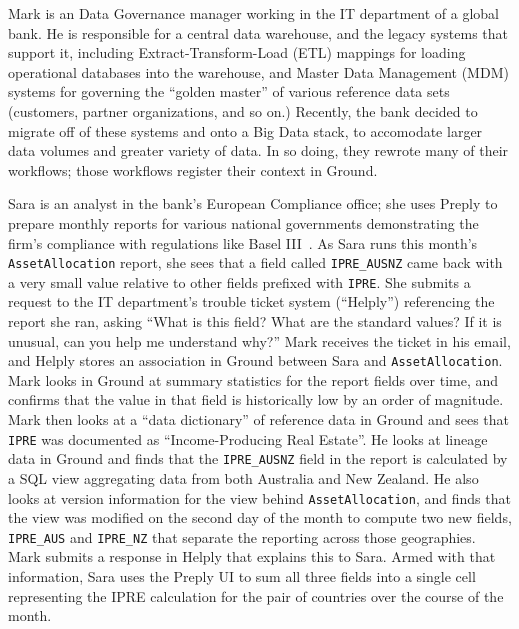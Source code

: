 \documentclass{sig-alternate}
\begin{document}
Mark is an Data Governance manager working in the IT department of a global bank. He is responsible for a central data warehouse, and the legacy systems that support it, including Extract-Transform-Load (ETL) mappings for loading operational databases into the warehouse, and Master Data Management (MDM) systems for governing the ``golden master'' of various reference data sets (customers, partner organizations, and so on.) Recently, the bank decided to migrate off of these systems and onto a Big Data stack, to accomodate larger data volumes and greater variety of data. In so doing, they rewrote many of their workflows; those workflows register their context in Ground.

Sara is an analyst in the bank's European Compliance office; she uses Preply to prepare monthly reports for various national governments demonstrating the firm's compliance with regulations like Basel III~\cite{basel3}. As Sara runs this month's \texttt{AssetAllocation} report, she sees that a field called \texttt{IPRE\_AUSNZ} came back with a very small value relative to other fields prefixed with \texttt{IPRE}. She submits a request to the IT department's trouble ticket system (``Helply'') referencing the report she ran, asking ``What is this field? What are the standard values? If it is unusual, can you help me understand why?'' Mark receives the ticket in his email, and Helply stores an association in Ground between Sara and \texttt{AssetAllocation}. Mark looks in Ground at summary statistics for the report fields over time, and confirms that the value in that field is historically low by an order of magnitude. Mark then looks at a ``data dictionary'' of reference data in Ground and sees that \texttt{IPRE} was documented as ``Income-Producing Real Estate''. He looks at lineage data in Ground and finds that the \texttt{IPRE\_AUSNZ} field in the report is calculated by a SQL view aggregating data from both Australia and New Zealand. He also looks at version information for the view behind \texttt{AssetAllocation}, and finds that the view was modified on the second day of the month to compute two new fields, \texttt{IPRE\_AUS} and \texttt{IPRE\_NZ} that separate the reporting across those geographies. Mark submits a response in Helply that explains this to Sara. Armed with that information, Sara uses the Preply UI to sum all three fields into a single cell representing the IPRE calculation for the pair of countries over the course of the month.
\end{document}

